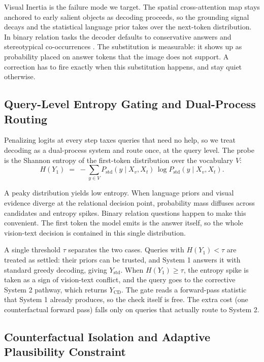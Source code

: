 \documentclass[pdflatex,sn-basic,Numbered]{sn-jnl}
\theoremstyle{thmstyleone}
\theoremstyle{thmstyletwo}
\theoremstyle{thmstylethree}
\begin{document}
Visual Inertia \cite{gong2026attention} is the failure mode we target. The spatial cross-attention map stays anchored to early salient objects as decoding proceeds, so the grounding signal decays and the statistical language prior takes over the next-token distribution. In binary relation tasks the decoder defaults to conservative answers and stereotypical co-occurrences \cite{yin2025mirage}. The substitution is measurable: it shows up as probability placed on answer tokens that the image does not support. A correction has to fire exactly when this substitution happens, and stay quiet otherwise.

\subsection{Query-Level Entropy Gating and Dual-Process Routing}\label{subsec:gate}

Penalizing logits at every step taxes queries that need no help, so we treat decoding as a dual-process system \cite{kahneman2011thinking} and route once, at the query level. The probe is the Shannon entropy \cite{shannon1948mathematical} of the first-token distribution over the vocabulary $V$:
\begin{equation}\label{eq:entropy}
H(Y_{1}) \;=\; -\sum_{y \in V} P_{\text{std}}(y \mid X_{v}, X_{t})\, \log P_{\text{std}}(y \mid X_{v}, X_{t}).
\end{equation}

A peaky distribution yields low entropy. When language priors and visual evidence diverge at the relational decision point, probability mass diffuses across candidates and entropy spikes. Binary relation questions happen to make this convenient. The first token the model emits is the answer itself, so the whole vision-text decision is contained in this single distribution.

A single threshold $\tau$ separates the two cases. Queries with $H(Y_{1}) < \tau$ are treated as settled: their priors can be trusted, and System 1 answers it with standard greedy decoding, giving $Y_{\text{std}}$. When $H(Y_{1}) \geq \tau$, the entropy spike is taken as a sign of vision-text conflict, and the query goes to the corrective System 2 pathway, which returns $Y_{\text{CD}}$. The gate reads a forward-pass statistic that System 1 already produces, so the check itself is free. The extra cost (one counterfactual forward pass) falls only on queries that actually route to System 2.

\subsection{Counterfactual Isolation and Adaptive Plausibility Constraint}\label{subsec:apc}
\end{document}
